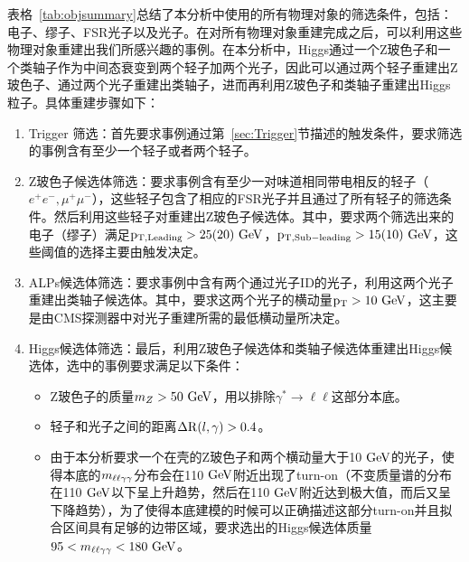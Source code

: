 表格~\ref{tab:objsummary}总结了本分析中使用的所有物理对象的筛选条件，包括：电子、缪子、FSR光子以及光子。在对所有物理对象重建完成之后，可以利用这些物理对象重建出我们所感兴趣的事例。在本分析中，Higgs通过一个Z玻色子和一个类轴子作为中间态衰变到两个轻子加两个光子，因此可以通过两个轻子重建出Z玻色子、通过两个光子重建出类轴子，进而再利用Z玻色子和类轴子重建出Higgs粒子。具体重建步骤如下：
\begin{enumerate}
    \item Trigger 筛选：首先要求事例通过第~\ref{sec:Trigger}节描述的触发条件，要求筛选的事例含有至少一个轻子或者两个轻子。
    \item Z玻色子候选体筛选：要求事例含有至少一对味道相同带电相反的轻子（$e^{+}e^{-}, \mu^{+}\mu^{-}$），这些轻子包含了相应的FSR光子并且通过了所有轻子的筛选条件。然后利用这些轻子对重建出Z玻色子候选体。其中，要求两个筛选出来的电子（缪子）满足$\mathrm{p_{T, Leading}>25 (20)\GeV}$，$\mathrm{p_{T, Sub-leading}>15 (10)\GeV}$，这些阈值的选择主要由触发决定。
    \item ALPs候选体筛选：要求事例中含有两个通过光子ID的光子，利用这两个光子重建出类轴子候选体。其中，要求这两个光子的横动量$\pt>10\GeV$，这主要是由CMS探测器中对光子重建所需的最低横动量所决定。
    \item Higgs候选体筛选：最后，利用Z玻色子候选体和类轴子候选体重建出Higgs候选体，选中的事例要求满足以下条件：
        \begin{itemize}
            \item Z玻色子的质量$m_{Z}>50\GeV$，用以排除$\gamma^{*}\rightarrow\ell\ell$这部分本底。
            \item 轻子和光子之间的距离$\mathrm{\Delta R}(l,\gamma)>0.4$。
            \item 由于本分析要求一个在壳的Z玻色子和两个横动量大于10$\GeV$的光子，使得本底的$m_{\ell\ell\gamma\gamma}$分布会在110$\GeV$附近出现了turn-on（不变质量谱的分布在110$\GeV$以下呈上升趋势，然后在110$\GeV$附近达到极大值，而后又呈下降趋势），为了使得本底建模的时候可以正确描述这部分turn-on并且拟合区间具有足够的边带区域，要求选出的Higgs候选体质量$95<\mllgg<180\GeV$。
        \end{itemize}
\end{enumerate}

